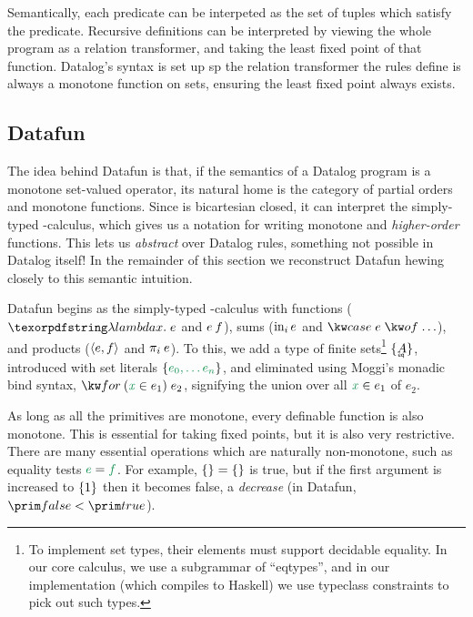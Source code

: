Semantically, each predicate can be interpeted as the set of tuples
which satisfy the predicate. Recursive definitions can be interpreted
by viewing the whole program as a relation transformer, and taking the
least fixed point of that function. Datalog's syntax is set up sp the
relation transformer the rules define is always a monotone function on
sets, ensuring the least fixed point always exists.

\subsection{Datafun}




The idea behind Datafun is that, if the semantics of a Datalog program
is a monotone set-valued operator, its natural home is the category
\Poset{} of partial orders and monotone functions. Since \Poset{} is
bicartesian closed, it can interpret the simply-typed \fn-calculus,
which gives us a notation for writing monotone and \emph{higher-order}
functions.
%
This lets us \emph{abstract} over Datalog rules, something not
possible in Datalog itself!
%
In the remainder of this section we reconstruct Datafun hewing closely
to this semantic intuition.

Datafun begins as the simply-typed \fn-calculus with functions ($\fnof
x e$ and $e\<f$), sums ($\mathrm{in}_{i}\, e$ and $\ecase{e}{\dots}$), and
products ($\langle{e,f}\rangle$ and $\pi_i\<e$). To this, we add a type of
finite sets\footnote{To implement set types, their elements must
  support decidable equality. In our core calculus, we use a
  subgrammar of ``eqtypes'', and in our implementation (which compiles
  to Haskell) we use typeclass constraints to pick out such types.}
$\tset{\eqt A}$, introduced with set literals $\eset{e_0, \ldots
  e_n}$, and eliminated using Moggi's monadic bind syntax,
$\efor{x}{e_1}{e_2}$, signifying the union over all $\dvar x \in e_1$
of $e_2$.

As long as all the primitives are monotone, every definable function
is also monotone. This is essential for taking fixed points, but it is
also very restrictive. There are many essential operations which are
naturally non-monotone, such as equality tests $\eeq e f$. For
example, $\eset{} = \eset{}$ is true, but if the first argument is
increased to $\{{1}\}$ then it becomes false, a \emph{decrease}
(in Datafun, $\efalse < \etrue$).

